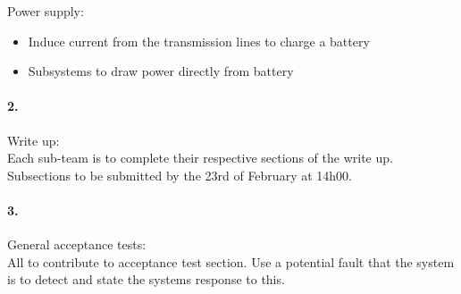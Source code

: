 \documentclass[12pt]{article}
\begin{document}
Power supply:
\begin{itemize}
  \item Induce current from the transmission lines to charge a battery
  \item Subsystems to draw power directly from battery
\end{itemize}

\paragraph[short]{2.} Write up:\\
Each sub-team is to complete their respective sections of the write up.
Subsections to be submitted by the 23rd of February at 14h00.

\paragraph[short]{3.} General acceptance tests:\\
All to contribute to acceptance test section. Use a potential fault that the system is to detect and state the
systems response to this.

%
%
\end{document}
